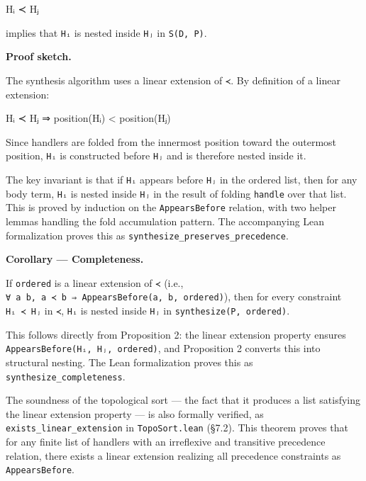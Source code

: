 \documentclass[
  11pt,
]{article}
\newenvironment{Shaded}{}{}
\newcommand{\NormalTok}[1]{#1}
\begin{document}
\begin{Shaded}
\begin{Highlighting}[]
\NormalTok{Hᵢ ≺ Hⱼ}
\end{Highlighting}
\end{Shaded}

implies that \texttt{Hᵢ} is nested inside \texttt{Hⱼ} in
\texttt{S(D,\ P)}.

\textbf{Proof sketch.}

The synthesis algorithm uses a linear extension of \texttt{≺}. By
definition of a linear extension:

\begin{Shaded}
\begin{Highlighting}[]
\NormalTok{Hᵢ ≺ Hⱼ ⇒ position(Hᵢ) \textless{} position(Hⱼ)}
\end{Highlighting}
\end{Shaded}

Since handlers are folded from the innermost position toward the
outermost position, \texttt{Hᵢ} is constructed before \texttt{Hⱼ} and is
therefore nested inside it.

The key invariant is that if \texttt{Hᵢ} appears before \texttt{Hⱼ} in
the ordered list, then for any body term, \texttt{Hᵢ} is nested inside
\texttt{Hⱼ} in the result of folding \texttt{handle} over that list.
This is proved by induction on the \texttt{AppearsBefore} relation, with
two helper lemmas handling the fold accumulation pattern. The
accompanying Lean formalization proves this as
\texttt{synthesize\_preserves\_precedence}.

\textbf{Corollary --- Completeness.}

If \texttt{ordered} is a linear extension of \texttt{≺} (i.e.,
\texttt{∀\ a\ b,\ a\ ≺\ b\ ⇒\ AppearsBefore(a,\ b,\ ordered)}), then for
every constraint \texttt{Hᵢ\ ≺\ Hⱼ} in \texttt{≺}, \texttt{Hᵢ} is nested
inside \texttt{Hⱼ} in \texttt{synthesize(P,\ ordered)}.

This follows directly from Proposition 2: the linear extension property
ensures \texttt{AppearsBefore(Hᵢ,\ Hⱼ,\ ordered)}, and Proposition 2
converts this into structural nesting. The Lean formalization proves
this as \texttt{synthesize\_completeness}.

The soundness of the topological sort --- the fact that it produces a
list satisfying the linear extension property --- is also formally
verified, as \texttt{exists\_linear\_extension} in
\texttt{TopoSort.lean} (§7.2). This theorem proves that for any finite
list of handlers with an irreflexive and transitive precedence relation,
there exists a linear extension realizing all precedence constraints as
\texttt{AppearsBefore}.
\end{document}
